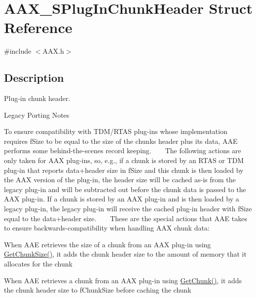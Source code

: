 \hypertarget{a00126}{}\section{A\+A\+X\+\_\+\+S\+Plug\+In\+Chunk\+Header Struct Reference}
\label{a00126}


{\ttfamily \#include $<$A\+A\+X.\+h$>$}



\subsection{Description}
Plug-\/in chunk header. 

\begin{DoxyRefDesc}{Legacy Porting Notes}
\item[\hyperlink{a00384__porting_notes000002}{Legacy Porting Notes}]To ensure compatibility with T\+D\+M/\+R\+T\+A\+S plug-\/ins whose implementation requires {\ttfamily f\+Size} to be equal to the size of the chunk\textquotesingle{}s header plus its data, A\+A\+E performs some behind-\/the-\/scenes record keeping. ~\newline
 ~\newline
 The following actions are only taken for A\+A\+X plug-\/ins, so, e.\+g., if a chunk is stored by an R\+T\+A\+S or T\+D\+M plug-\/in that reports data+header size in {\ttfamily f\+Size} and this chunk is then loaded by the A\+A\+X version of the plug-\/in, the header size will be cached as-\/is from the legacy plug-\/in and will be subtracted out before the chunk data is passed to the A\+A\+X plug-\/in. If a chunk is stored by an A\+A\+X plug-\/in and is then loaded by a legacy plug-\/in, the legacy plug-\/in will receive the cached plug-\/in header with {\ttfamily f\+Size} equal to the data+header size. ~\newline
 ~\newline
 These are the special actions that A\+A\+E takes to ensure backwards-\/compatibility when handling A\+A\+X chunk data\+:
\begin{DoxyItemize}
\item When A\+A\+E retrieves the size of a chunk from an A\+A\+X plug-\/in using \hyperlink{a00061_aa986711cd372febcaae803e86ae08f63}{Get\+Chunk\+Size()}, it adds the chunk header size to the amount of memory that it allocates for the chunk ~\newline

\item When A\+A\+E retrieves a chunk from an A\+A\+X plug-\/in using \hyperlink{a00061_ab977041a440a9cd6f3e631c059ee8b99}{Get\+Chunk()}, it adds the chunk header size to {\ttfamily f\+Chunk\+Size} before caching the chunk ~\newline


\end{DoxyItemize}
\end{DoxyRefDesc}

